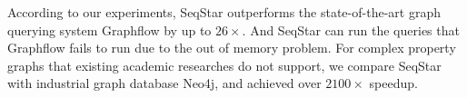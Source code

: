 According to our experiments, SeqStar outperforms the state-of-the-art graph querying system Graphflow by up to $26\times$.
And SeqStar can run the queries that Graphflow fails to run due to the out of memory problem.
For complex property graphs that existing academic researches do not support,
we compare SeqStar with industrial graph database Neo4j, and achieved over $2100\times$ speedup.



